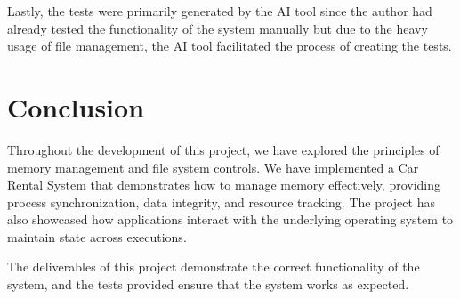 \documentclass[conference]{IEEEtran}
\begin{document}
Lastly, the tests were primarily generated by the AI tool since the author had already tested the functionality of the system manually but due to the heavy usage of file management, the AI tool facilitated the process of creating the tests. 

\section{Conclusion}
Throughout the development of this project, we have explored the principles of memory management and file system controls. We have implemented a Car Rental System that demonstrates how to manage memory effectively, providing process synchronization, data integrity, and resource tracking. The project has also showcased how applications interact with the underlying operating system to maintain state across executions. 

The deliverables of this project demonstrate the correct functionality of the system, and the tests provided ensure that the system works as expected. 
\end{document}
